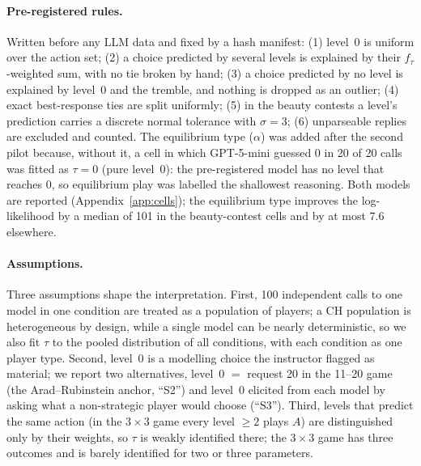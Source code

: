 \documentclass[11pt]{article}
\begin{document}
\paragraph{Pre-registered rules.} Written before any LLM data and fixed by a hash manifest: (1) level~0 is uniform over the action set; (2) a choice predicted by several levels is explained by their $f_\tau$-weighted sum, with no tie broken by hand; (3) a choice predicted by no level is explained by level~0 and the tremble, and nothing is dropped as an outlier; (4) exact best-response ties are split uniformly; (5) in the beauty contests a level's prediction carries a discrete normal tolerance with $\sigma=3$; (6) unparseable replies are excluded and counted. The equilibrium type ($\alpha$) was added after the second pilot because, without it, a cell in which GPT-5-mini guessed 0 in 20 of 20 calls was fitted as $\tau=0$ (pure level~0): the pre-registered model has no level that reaches 0, so equilibrium play was labelled the shallowest reasoning. Both models are reported (Appendix~\ref{app:cells}); the equilibrium type improves the log-likelihood by a median of 101 in the beauty-contest cells and by at most 7.6 elsewhere.

\paragraph{Assumptions.} Three assumptions shape the interpretation. First, 100 independent calls to one model in one condition are treated as a population of players; a CH population is heterogeneous by design, while a single model can be nearly deterministic, so we also fit $\tau$ to the pooled distribution of all conditions, with each condition as one player type. Second, level~0 is a modelling choice the instructor flagged as material; we report two alternatives, level~0 $=$ request 20 in the 11--20 game (the Arad--Rubinstein anchor, ``S2'') and level~0 elicited from each model by asking what a non-strategic player would choose (``S3''). Third, levels that predict the same action (in the $3{\times}3$ game every level $\ge2$ plays $A$) are distinguished only by their weights, so $\tau$ is weakly identified there; the $3{\times}3$ game has three outcomes and is barely identified for two or three parameters.
\end{document}
